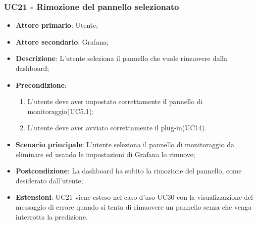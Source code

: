 \subsubsection{UC21 - Rimozione del pannello selezionato}
\label{sssec:uc21}
\begin{itemize}
  \item \textbf{Attore primario}: Utente;
  \item \textbf{Attore secondario}: Grafana;
  \item \textbf{Descrizione}: L'utente seleziona il pannello che vuole rimuovere dalla dashboard;
  \item \textbf{Precondizione}:
  \begin{enumerate}
		\item L'utente deve aver impostato correttamente il pannello di monitoraggio(UC5.1);
		\item L'utente deve aver avviato correttamente il plug-in(UC14).
	\end{enumerate}
  \item \textbf{Scenario principale}: L'utente seleziona il pannello di monitoraggio da eliminare ed usando le impostazioni di Grafana lo rimuove;
  \item \textbf{Postcondizione}: La dashboard ha subito la rimozione del pannello, come desiderato dall'utente;
  \item \textbf{Estensioni}: UC21 viene esteso nel caso d'uso UC30 con la visualizzazione del messaggio di errore quando si tenta di rimuovere un pannello senza che venga interrotta la predizione.
\end{itemize}
